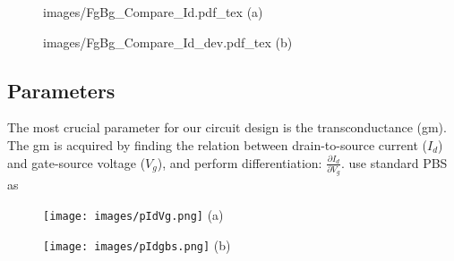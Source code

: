 %


\begin{figure}[!htbp]
    \centering
    \begin{minipage}[t][0.1\textheight]{1\textwidth}
        \centering
        \def\svgwidth{10cm}
        \fontsize{6}{15}\selectfont
         {images/FgBg_Compare_Id.pdf_tex}
        (a)
    \end{minipage}
    \vfill
    \begin{minipage}[t][0.1\textheight]{1\textwidth}
        \centering
        \def\svgwidth{10cm}
        \fontsize{6}{15}\selectfont
         {images/FgBg_Compare_Id_dev.pdf_tex}
        (b)
    \end{minipage}
    \caption{}
    \label{fig:IdVgandgbsId}
\end{figure}

\subsection{Parameters}
The most crucial parameter for our circuit design is the transconductance (gm).
{\color{red}
    The gm is acquired by finding the relation between drain-to-source current ($I_d$) and gate-source voltage ($V_g$), and perform differentiation: $\frac{\partial I_d}{\partial V_g}$.
    use standard PBS as
}

\begin{figure}[!htbp]
    \centering
    \begin{minipage}[t][0.1\textheight]{1\textwidth}
        \centering
        \texttt{[image: images/pIdVg.png]}
        (a)
    \end{minipage}
    \hfill
    \begin{minipage}[t][0.1\textheight]{1\textwidth}
        \centering
        \texttt{[image: images/pIdgbs.png]}
        (b)
    \end{minipage}
    \caption{}
    \label{fig:pIdVg}
\end{figure}

